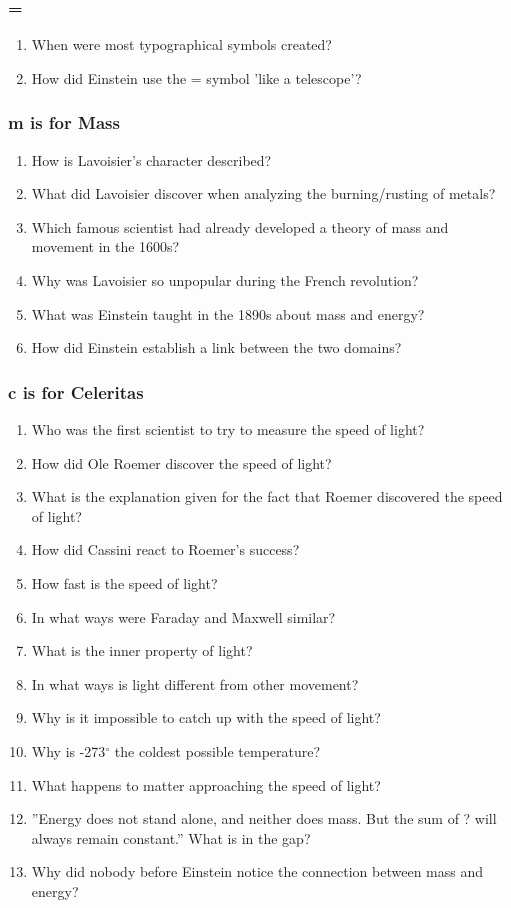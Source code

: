 \subsubsection*{=}
\begin{enumerate}  
\item When were most typographical symbols created?
\item How did Einstein use the = symbol 'like a telescope'?
\end{enumerate}

\subsubsection*{m is for Mass}
\begin{enumerate}  
\item How is Lavoisier's character described?
\item What did Lavoisier discover when analyzing the burning/rusting of metals?
\item Which famous scientist had already developed a theory of mass and movement in the 1600s?
\item Why was Lavoisier so unpopular during the French revolution?
\item What was Einstein taught in the 1890s about mass and energy?
\item How did Einstein establish a link between the two domains?
\end{enumerate}

\subsubsection*{c is for Celeritas}
\begin{enumerate}  
\item Who was the first scientist to try to measure the speed of light?
\item How did Ole Roemer discover the speed of light?
\item What is the explanation given for the fact that Roemer discovered the speed of light?
\item How did Cassini react to Roemer’s success?
\item How fast is the speed of light?
\item In what ways were Faraday and Maxwell similar?
\item What is the inner property of light?
\item In what ways is light different from other movement?
\item Why is it impossible to catch up with the speed of light?
\item Why is -273${^\circ}$ the coldest possible temperature?
\item What happens to matter approaching the speed of light?
\item ''Energy does not stand alone, and neither does mass. But the sum of ? will always remain constant.'' What is in the gap?
\item Why did nobody before Einstein notice the connection between mass and energy?
\end{enumerate}

